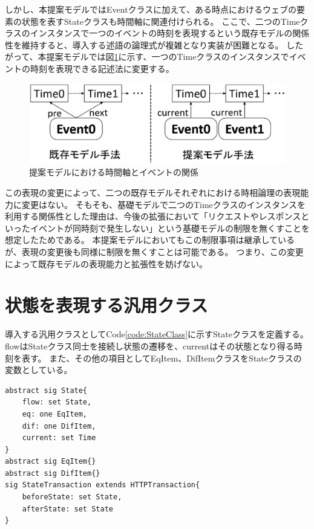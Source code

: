 \documentclass[12pt,a4paper]{jbook}
\begin{document}
しかし、本提案モデルではEventクラスに加えて、ある時点におけるウェブの要素の状態を表すStateクラスも時間軸に関連付けられる。
ここで、二つのTimeクラスのインスタンスで一つのイベントの時刻を表現するという既存モデルの関係性を維持すると、導入する述語の論理式が複雑となり実装が困難となる。
したがって、本提案モデルでは図\ref{fig:ProposedModel-TimeClass}に示す、一つのTimeクラスのインスタンスでイベントの時刻を表現できる記述法に変更する。

\begin{figure}[htb]
\centering
\includegraphics[width=450pt]{./fig/ProposedModel-TimeClass.eps}
\caption{提案モデルにおける時間軸とイベントの関係}
\label{fig:ProposedModel-TimeClass}
\end{figure}

この表現の変更によって、二つの既存モデルそれぞれにおける時相論理の表現能力に変更はない。
そもそも、基礎モデルで二つのTimeクラスのインスタンスを利用する関係性とした理由は、今後の拡張において「リクエストやレスポンスといったイベントが同時刻で発生しない」という基礎モデルの制限を無くすことを想定したためである。
本提案モデルにおいてもこの制限事項は継承しているが、表現の変更後も同様に制限を無くすことは可能である。
つまり、この変更によって既存モデルの表現能力と拡張性を妨げない。

\section{状態を表現する汎用クラス}
導入する汎用クラスとしてCode\ref{code:StateClass}に示すStateクラスを定義する。
flowはStateクラス同士を接続し状態の遷移を、currentはその状態となり得る時刻を表す。
また、その他の項目としてEqItem、DifItemクラスをStateクラスの変数としている。
\begin{lstlisting}[caption=Stateクラス, label=code:StateClass]
abstract sig State{
	flow: set State,
	eq: one EqItem,
	dif: one DifItem,
	current: set Time
}
abstract sig EqItem{}
abstract sig DifItem{}
sig StateTransaction extends HTTPTransaction{
	beforeState: set State,
	afterState: set State
}
\end{lstlisting}
\end{document}
